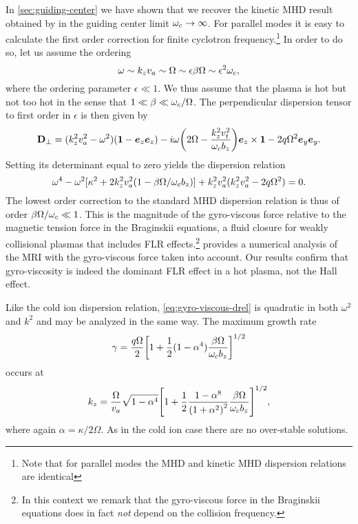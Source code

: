 \documentclass[aps,pre,notitlepage,amsmath,amssymb,amsfonts,nobibnotes,nofootinbib,superscriptaddress]{revtex4-1}
\begin{document}
In \cref{sec:guiding-center} we have shown that we recover the kinetic MHD
result obtained by \citet{Quataert2002} in the guiding center limit
$\omega_c\to\infty$. For parallel modes it is easy to calculate the first order
correction for finite cyclotron frequency.\footnote{Note that for parallel
  modes the MHD and kinetic MHD dispersion relations are identical} In order
to do so, let us assume the ordering
\begin{equation}
  \label{eq:ordering}
  \omega\sim k_z\va\sim\Omega\sim\epsilon\beta\Omega
  \sim\epsilon^2\omc,
\end{equation}
where the ordering parameter $\epsilon\ll1$. We thus assume that the plasma is
hot but not too hot in the sense that $1\ll\beta\ll\omega_c/\Omega$. The
perpendicular dispersion tensor to first order in $\epsilon$ is then given by
\begin{equation}
  \label{eq:gyro-viscous-drel}
  \mathbf{D}_\perp = (k_z^2\va^2 - \omega^2)(\mathbf{1} - \ez\ez)
  - i\omega\left(
    2\Omega - \frac{k_z^2\vt^2}{\omc b_z}
  \right)\ez\times\mathbf{1} - 2q\Omega^2\ey\ey.
\end{equation}
Setting its determinant equal to zero yields the dispersion relation
\begin{equation}
  \omega^4
  - \omega^2[\kappa^2 + 2k_z^2\va^2\left(1 - \beta\Omega/\omc b_z\right)]
  + k_z^2\va^2(k_z^2\va^2 - 2q\Omega^2) = 0.
\end{equation}
The lowest order correction to the standard MHD dispersion relation is thus of
order $\beta\Omega/\omega_c\ll{}1$. This is the magnitude of the gyro-viscous
force relative to the magnetic tension force in the Braginskii equations, a
fluid closure for weakly collisional plasmas that includes FLR
effects.\footnote{In this context we remark that the gyro-viscous force in the
  Braginskii equations does in fact \emph{not} depend on the collision
  frequency.} \citet{Ferraro2007} provides a numerical analysis of the MRI
with the gyro-viscous force taken into account. Our results confirm that
gyro-viscosity is indeed the dominant FLR effect in a hot plasma, not the Hall
effect.

Like the cold ion dispersion relation, \cref{eq:gyro-viscous-drel} is
quadratic in both $\omega^2$ and $k^2$ and may be analyzed in the same way.
The maximum growth rate
\begin{equation}
  \label{eq:maximum-growth-rate}
  \gamma = \frac{q\Omega}{2}{\left[
    1 + \frac{1}{2}(1-\alpha^4)\frac{\beta\Omega}{\omc b_z}
  \right]}^{1/2}
\end{equation}
occurs at
\begin{equation}
  \label{eq:optimal-wave-number}
  k_z = \frac{\Omega}{\va}\sqrt{1-\alpha^4}{\left[
    1 + \frac{1}{2}\frac{1-\alpha^8}{{(1+\alpha^2)}^2}
    \frac{\beta\Omega}{\omc b_z}
  \right]}^{1/2},
\end{equation}
where again $\alpha=\kappa/2\Omega$. As in the cold ion case there are no
over-stable solutions. 
\end{document}
